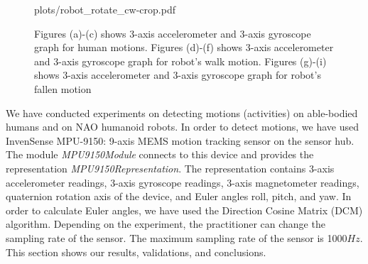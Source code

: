 \documentclass[letterpaper]{article}
\begin{document}
\begin{figure}[!t]
{{plots/robot_rotate_cw-crop.pdf}}
\\

\caption{Figures (a)-(c) shows 3-axis accelerometer and 3-axis gyroscope graph for human motions. Figures (d)-(f) shows 3-axis accelerometer and 3-axis gyroscope graph for robot's walk motion. Figures (g)-(i) shows 3-axis accelerometer and 3-axis gyroscope graph for robot's fallen motion}
 \label{fig:anotation-human-robot} 
\end{figure}


We have conducted experiments on detecting motions (activities) on able-bodied humans and on NAO
humanoid robots. In order to detect motions, we have used InvenSense MPU-9150: 9-axis MEMS
motion tracking sensor on the sensor hub. The module {\em MPU9150Module} connects to this device
and provides the representation {\em MPU9150Representation}. The representation contains
3-axis accelerometer readings, 3-axis gyroscope readings, 3-axis magnetometer readings, quaternion
rotation axis of the device, and Euler angles roll, pitch, and yaw.  In order to calculate Euler
angles, we have used the Direction Cosine Matrix (DCM)
algorithm.  Depending on the
experiment, the practitioner can change the sampling rate of the sensor.  The maximum sampling rate
of the sensor is 1000$Hz$. This section shows our results, validations, and conclusions.
\end{document}
